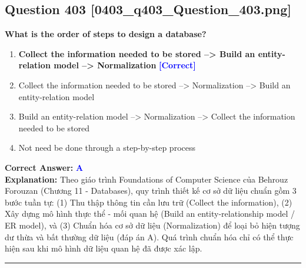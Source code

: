 \documentclass[11pt,a4paper]{article}
\begin{document}
\begin{minipage}{\textwidth}
\subsection*{Question 403 \quad \footnotesize{[0403\_q403\_Question\_403.png]}}
\noindent \textbf{What is the order of steps to design a database?}

\begin{enumerate}[label=\Alph*.]
    \item \textbf{Collect the information needed to be stored --> Build an entity-relation model --> Normalization} \hfill \textcolor{blue}{\textbf{[Correct]}}
    \item Collect the information needed to be stored --> Normalization --> Build an entity-relation model
    \item Build an entity-relation model --> Normalization --> Collect the information needed to be stored
    \item Not need be done through a step-by-step process
\end{enumerate}

\noindent \textbf{Correct Answer:} \textcolor{blue}{\textbf{A}} \\[2pt]
\noindent \textbf{Explanation:} Theo giáo trình Foundations of Computer Science của Behrouz Forouzan (Chương 11 - Databases), quy trình thiết kế cơ sở dữ liệu chuẩn gồm 3 bước tuần tự: (1) Thu thập thông tin cần lưu trữ (Collect the information), (2) Xây dựng mô hình thực thể - mối quan hệ (Build an entity-relationship model / ER model), và (3) Chuẩn hóa cơ sở dữ liệu (Normalization) để loại bỏ hiện tượng dư thừa và bất thường dữ liệu (đáp án A). Quá trình chuẩn hóa chỉ có thể thực hiện sau khi mô hình dữ liệu quan hệ đã được xác lập.

\par\vspace{0.3cm}
\hrule
\vspace{0.3cm}
\end{minipage}
\end{document}
